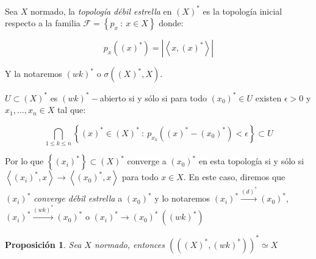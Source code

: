 \documentclass[11pt]{article}
\newcommand{\F}{\mathcal{F}}
\newcommand\tq{~:~}
\newcommand{\dual}[1]{\left(#1\right)^{\ast}}
\newcommand{\abs}[1]{\left\lvert#1\right\rvert}
\newcommand{\ip}[1]{\left\langle#1\right\rangle}
\newcommand{\sett}[1]{\left\lbrace#1\right\rbrace}
\newcommand{\Bigcap}[2]{\bigcap\limits_{#1}{#2}}
\numberwithin{theorem}{subsection}
\newtheorem{proposition}[theorem]{Proposici\'on}
\newenvironment{definition}[1][Definici\'on]{\begin{trivlist}
		\item[\hskip \labelsep {\bfseries #1}]}{\end{trivlist}}
\newenvironment{remark}[1][Observaci\'on]{\begin{trivlist}
		\item[\hskip \labelsep {\bfseries #1}]}{\end{trivlist}}
\begin{document}
\begin{definition}
	Sea $X$ normado, la \textit{topolog\'ia d\'ebil estrella} en $\dual{X}$ es la topolog\'ia inicial respecto a la familia $\F = \sett{p_x \tq x \in X}$ donde:
	
	\begin{equation*}
	p_x(\dual{x}) = \abs{\ip{x,\dual{x}}}
	\end{equation*}
	
	Y la notaremos $\dual{wk}$ o $\sigma(\dual{X},X)$. 
	
\end{definition}
	
\begin{remark}
		
		$U \subset \dual{X}$ es $\dual{wk}-$abierto si y s\'olo si para todo $\dual{x_0} \in U$ existen $\epsilon > 0$ y $x_1, \dots, x_n \in X$ tal que:
		
		\begin{equation*}
		\Bigcap{1 \leq k \leq n}{\sett{\dual{x} \in \dual{X} \tq p_{x_k}(\dual{x}-\dual{x_0}) < \epsilon}} \subset U
		\end{equation*}
		
		Por lo que $\sett{\dual{x_i}} \subset \dual{X}$ converge a $\dual{x_0}$ en esta topolog\'ia si y s\'olo si $\ip{\dual{x_i},x} \rightarrow \ip{\dual{x_0},x}$ para todo $x \in X$. En este caso, diremos que $\dual{x_i}$ \textit{converge d\'ebil estrella} a $\dual{x_0}$ y lo notaremos $\dual{x_i} \xrightarrow{\dual{d}} \dual{x_0}$, $\dual{x_i} \xrightarrow{\dual{wk}} \dual{x_0}$ o $\dual{x_i} \rightarrow \dual{x_0} \ (\dual{wk})$
\end{remark}

\begin{proposition}
	\label{El dual a la topologia debil estrella es X}
	Sea $X$ normado, entonces $\dual{(\dual{X}, \dual{wk})} \simeq X$
\end{proposition}
\end{document}
